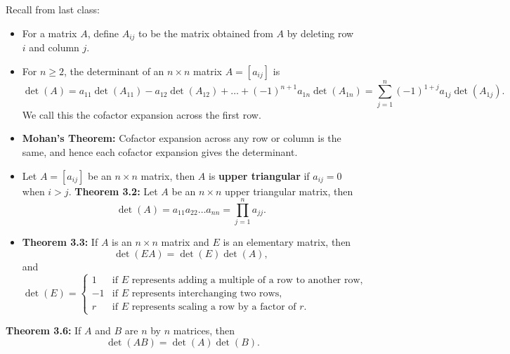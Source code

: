 \documentclass[12pt,letterpaper]{article}
\begin{document}
\thispagestyle{fancy}

Recall from last class:

\begin{itemize}
\item For a matrix $A$, define  $A_{ij}$ to be the matrix obtained from $A$ by deleting row $i$ and column $j$.
\item For $n\geq 2$, the determinant of an $n\times n$ matrix $A=[a_{ij}]$ is
\begin{equation*}
\operatorname{det}(A)= a_{11} \operatorname{det}(A_{11}) - a_{12} \operatorname{det}(A_{12})+\dots + (-1)^{n+1} a_{1n} \operatorname{det}(A_{1n})=\sum_{j=1}^{n}(-1)^{1+j}a_{1j} \operatorname{det}(A_{1j}).
\end{equation*} We call this the cofactor expansion across the first row.
\item {\bf Mohan's Theorem:} Cofactor expansion across any row or column is the same, and hence each cofactor expansion gives the determinant.
\item Let $A=[a_{ij}]$ be an $n\times n$ matrix, then $A$ is {\bf upper triangular} if $a_{ij}=0$ when $i>j$.
{\bf Theorem 3.2:} Let $A$ be an $n\times n$ upper triangular matrix, then $$\operatorname{det}(A)= a_{11}a_{22}\dots a_{nn} = \prod_{j=1}^n a_{jj}.$$
\item {\bf Theorem 3.3:} If $A$ is an $n\times n$ matrix and $E$ is an elementary matrix, then $$\operatorname{det}(EA)=\operatorname{det}(E) \operatorname{det}(A),$$ and 
$$\operatorname{det}(E)=\begin{cases}
1 & \text{if $E$ represents adding a multiple of a row to another row,}\\
-1 & \text{if $E$ represents interchanging two rows,}\\
r & \text{if $E$ represents scaling a row by a factor of $r$.}
\end{cases}$$
\end{itemize}

\newpage

{\bf Theorem 3.6:} If $A$ and $B$ are $n$ by $n$ matrices, then $$\operatorname{det}(AB)=\operatorname{det}(A)\operatorname{det}(B).$$
\end{document}
